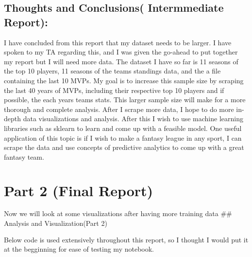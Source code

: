\documentclass[11pt]{article}
\begin{document}
    \subsection{Thoughts and Conclusions( Intermmediate
Report):}\label{thoughts-and-conclusions-intermmediate-report}

I have concluded from this report that my dataset needs to be larger. I
have spoken to my TA regarding this, and I was given the go-ahead to put
together my report but I will need more data. The dataset I have so far
is 11 seasons of the top 10 players, 11 seasons of the teams standings
data, and the a file containing the last 10 MVPs. My goal is to increase
this sample size by scraping the last 40 years of MVPs, including their
respective top 10 players and if possible, the each years teams stats.
This larger sample size will make for a more thorough and complete
analysis. After I scrape more data, I hope to do more in-depth data
visualizations and analysis. After this I wish to use machine learning
libraries such as sklearn to learn and come up with a feasible model.
One useful application of this topic is if I wish to make a fantasy
league in any sport, I can scrape the data and use concepts of
predictive analytics to come up with a great fantasy team.

    \section{Part 2 (Final Report)}\label{part-2-final-report}

    Now we will look at some visualizations after having more training data
\#\# Analysis and Visualization(Part 2) \newline

Below code is used extensively throughout this report, so I thought I
would put it at the begginning for ease of testing my notebook.
\end{document}
